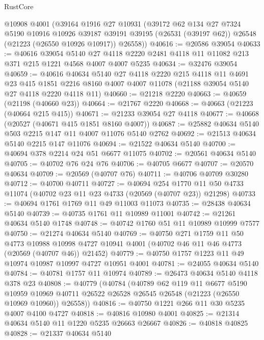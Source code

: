 \begin{lexlean}{RustCore}
\begin{coremodule}
    @10908
    @4001
    (@39164
      @1916
      @27
      @10931
      (@39172
        @62
        @134
        @27
        @7324
        @5190
        @10916
        @10926
        @39187
        @39191
        @39195
        (@26531 (@39197 @62))
        @26548
        (@21223 (@26550 @10926 @10917))
        @26558))
@40616 := @20586 @39054
@40633 := @40616
    @39054
    @5140
    @27
    @4118
    @2220
    @2481
    @4118
    @11
    @11082
    @213
    @371
    @215
    @1221
    @4568
    @4007
    @4007
    @5235
@40634 := @32476 @39054
@40659 := @40616
    @40634
    @5140
    @27
    @4118
    @2220
    @215
    @4118
    @11
    @4691
    @23
    @415
    @1851
    @2216
    @8160
    @4007
    @4007
    @11078
    (@21188 @39054 @5140 @27 @4118 @2220 @4118 @11)
@40660 := @21218 @2220
@40663 := @40659 (@21198 (@40660 @23))
@40664 := @21767 @2220
@40668 := @40663 (@21223 (@40664 @215 @415))
@40671 := @21233 @39054 @27 @4118
@40677 := @40668 (@20527 (@40671 @415 @1851 @8160 @4007))
@40687 := @25882 @40634 @5140 @503 @2215 @147 @11 @4007 @11076 @5140 @2762
@40692 := @21513 @40634 @5140 @2215 @147 @11076
@40694 := @21522 @40634 @5140
@40700 := @40694 @378 @2214 @24 @51 @6677 @11075
@40702 := @20561 @40634 @5140
@40705 := @40702 @76 @24 @76
@40706 := @40705 @6677
@40707 := @20570 @40634
@40709 := @20569 (@40707 @76)
@40711 := @40706 @40709 @30280
@40712 := @40700 @40711
@40727 := @40694
    @254
    @1770
    @11
    @50
    @4733
    @11074
    (@40702 @23 @11 @23 @4733 (@20569 (@40707 @23)) @21298)
@40733 := @40694 @1761 @1769 @11 @49 @11003 @11073
@40735 := @28438 @40634 @5140
@40739 := @40735 @1761 @11 @10989 @11001
@40742 := @21261 @40634 @5140 @1748
@40748 := @40742 @1760 @51 @11 @10989 @10999 @7577
@40750 := @21274 @40634 @5140
@40769 := @40750
    @271
    @1759
    @11
    @50
    @4773
    @10988
    @10998
    @4727
    @10941
    @4001
    (@40702 @46 @11 @46 @4773 (@20569 (@40707 @46)) @21452)
@40779 := @40750 @1757 @1223 @11 @49 @10974 @10987 @10997 @4727 @10951 @4001
@40781 := @24055 @40634 @5140
@40784 := @40781 @1757 @11 @10974
@40789 := @26473 @40634 @5140 @4118 @378 @23
@40808 := @40779
    (@40784
      (@40789
        @62
        @119
        @11
        @6677
        @5190
        @10959
        @10969
        @40711
        @26522
        @26528
        @26545
        @26548
        (@21223 (@26550 @10969 @10960))
        @26558))
@40816 := @40750 @1221 @266 @11 @30 @5235 @4007 @4100 @4727
@40818 := @40816 @10980 @4001
@40825 := @21314 @40634 @5140 @11 @1220 @5235 @26663 @26667
@40826 := @40818 @40825
@40828 := @21337 @40634 @5140

\end{coremodule}
\end{lexlean}

